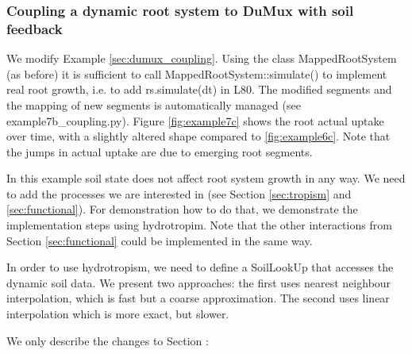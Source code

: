 \subsubsection*{Coupling a dynamic root system to DuMux with soil feedback} \label{sec:dumux_dyn_coupling}

We modify Example \ref{sec:dumux_coupling}. Using the class MappedRootSystem (as before) it is sufficient to call MappedRootSystem::simulate() to implement real root growth, i.e. to add rs.simulate(dt) in L80. The modified segments and the mapping of new segments is automatically managed (see example7b\_coupling.py). Figure \ref{fig:example7c} shows the root actual uptake over time, with a slightly altered shape compared to \ref{fig:example6c}. Note that the jumps in actual uptake are due to emerging root segments.

In this example soil state does not affect root system growth in any way. We need to add the processes we are interested in (see Section \ref{sec:tropism} and \ref{sec:functional}). For demonstration how to do that, we demonstrate the implementation steps using hydrotropim. Note that the other interactions from Section \ref{sec:functional} could be implemented in the same way. 

In order to use hydrotropism, we need to define a SoilLookUp that accesses the dynamic soil data. We present two approaches: the first uses nearest neighbour interpolation, which is fast but a coarse approximation. The second uses linear interpolation which is more exact, but slower. 



We only describe the changes to Section \label{sec:dumux_coupling}:


